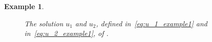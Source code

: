 \documentclass[a4paper, 10pt, final]{article}
\newtheorem{example}{Example}[section]
\begin{document}
\begin{example}
\begin{figure}
\begin{tikzpicture}[line cap=round,line join=round,x=1.cm,y=1.cm]
    \end{tikzpicture}
    \caption{The solution $u_1$ and $u_2$, defined in~\eqref{eq:u_1_example1} and
    in~\eqref{eq:u_2_example1}, of .}
    \label{fig:ex-3-fig-2}
  \end{figure}

\end{example}
\end{document}
